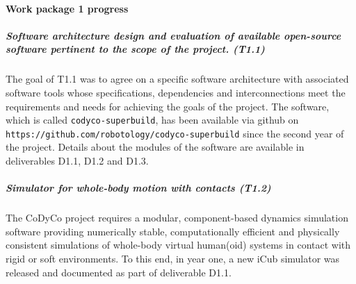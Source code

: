 

\newcommand{\EQ}{\!\!\!=\!\!\!}

\newcommand{\Bp}{\mathbf{p}}
\newcommand{\Br}{\mathbf{r}}
\newcommand{\Bf}{\mathbf{f}}
\newcommand{\BJ}{\mathbf{J}}
\newcommand{\Bv}{\mathbf{v}}
\newcommand{\BI}{\mathbf{I}}
\newcommand{\BR}{\mathbf{R}}
\newcommand{\BK}{\mathbf{K}}
\newcommand{\BD}{\mathbf{D}}
\newcommand{\BA}{\mathbf{A}}
\newcommand{\Bb}{\mathbf{b}}
\newcommand{\BM}{\mathbf{M}}
\newcommand{\BC}{\mathbf{C}}
\newcommand{\Bg}{\mathbf{g}}
\newcommand{\BS}{\mathbf{S}}
\newcommand{\Bzero}{\mathbf{0}}
\newcommand{\BN}{\mathbf{N}}
\newcommand{\Bh}{\mathbf{h}}
\newcommand{\BW}{\mathbf{W}}
\newcommand{\Bq}{\mathbf{q}}
\newcommand{\BF}{\mathbf{F}}
\newcommand{\Bn}{\mathbf{n}}
\newcommand{\BZ}{\mathbf{Z}}
\newcommand{\BB}{\mathbf{B}}
\newcommand{\Bc}{\mathbf{c}}

\newcommand{\Bomega}{\boldsymbol{\omega}}
\newcommand{\Btau}{\boldsymbol{\tau}}
\newcommand{\Balpha}{\boldsymbol{\alpha}}
\newcommand{\Bbeta}{\boldsymbol{\beta}}



\paragraph{Work package 1 progress}

\subparagraph{Software architecture design and evaluation of available
  open-source software pertinent to the scope of the project. (T1.1)}

The goal of T1.1 was to agree on a specific software architecture with
associated software tools whose specifications, dependencies and
interconnections meet the requirements and needs for achieving the goals of
the project.  The software, which is called \texttt{codyco-superbuild}, has
been available via github on
\texttt{https://github.com/robotology/codyco-superbuild} since the second year
of the project.  Details about the modules of the software are available in
deliverables D1.1, D1.2 and D1.3.

\subparagraph{Simulator for whole-body motion with contacts (T1.2)}

The CoDyCo project requires a modular, component-based dynamics simulation
software providing numerically stable, computationally efficient and
physically consistent simulations of whole-body virtual human(oid) systems in
contact with rigid or soft environments.  To this end, in year one, a new iCub
simulator was released and documented as part of deliverable D1.1.


